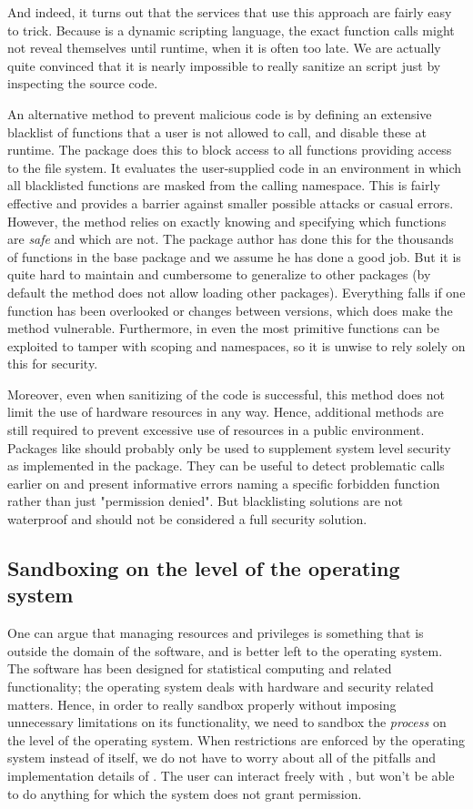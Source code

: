 And indeed, it turns out that the services that use this approach are fairly
easy to trick. Because \R is a dynamic scripting language, the exact function
calls might not reveal themselves until runtime, when it is often too late. We
are actually quite convinced that it is nearly impossible to really sanitize an
\R script just by inspecting the source code.

An alternative method to prevent malicious code is by defining an extensive
blacklist of functions that a user is not allowed to call, and disable these at
runtime. The  package \citep{sandboxR}  does this to block access
to all \R functions providing access to the file system. It evaluates the
user-supplied code in an environment in which all blacklisted functions are
masked from the calling namespace. This is fairly effective and provides a
barrier against smaller possible attacks or casual errors. However, the method
relies on exactly knowing and specifying which functions are \emph{safe} and
which are not. The package author has done this for the thousands of \R
functions in the base package and we assume he has done a good job. But it is
quite hard to maintain and cumbersome to generalize to other \R packages (by
default the method does not allow loading other packages). Everything falls if
one function has been overlooked or changes between versions, which does make
the method vulnerable. Furthermore, in \R even the most primitive functions can
be exploited to tamper with scoping and namespaces, so it is unwise to rely
solely on this for security.

Moreover, even when sanitizing of the code is successful, this method does not
limit the use of hardware resources in any way. Hence, additional methods are
still required to prevent excessive use of resources in a public environment.
Packages like  should probably only be used to supplement system
level security as implemented in the \RAppArmor package. They can be useful to
detect problematic calls earlier on and present informative errors naming a
specific forbidden function rather than just "permission denied". But
blacklisting solutions are not waterproof and should not be considered a full
security solution.

\subsection{Sandboxing on the level of the operating system}

One can argue that managing resources and privileges is something that is
outside the domain of the \R software, and is better left to the operating
system. The \R software has been designed for statistical computing and related
functionality; the operating system deals with hardware and security related
matters. Hence, in order to really sandbox \R properly without imposing
unnecessary limitations on its functionality, we need to sandbox the
\emph{process} on the level of the operating system. When restrictions are
enforced by the operating system instead of \R itself, we do not have to worry
about all of the pitfalls and implementation details of \R. The user can
interact freely with \R, but won't be able to do anything for which the system
does not grant permission.

